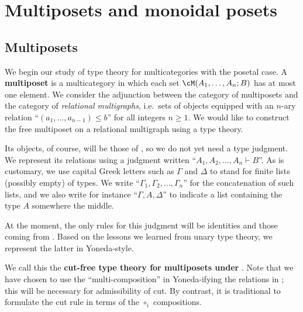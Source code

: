 \documentclass{book}
\let\types\vdash
\begin{document}
\section{Multiposets and monoidal posets}
\label{sec:multiposets-monpos}

\subsection{Multiposets}
\label{sec:multiposets}

We begin our study of type theory for multicategories with the posetal case.
A \textbf{multiposet} is a multicategory in which each set $\cM(A_1,\dots,A_n;B)$ has at most one element.
We consider the adjunction between the category \bMPos of multiposets and the category \bRelMGr of \emph{relational multigraphs}, i.e.\ sets of objects equipped with an $n$-ary relation ``$(a_1,\dots,a_{n-1})\le b$'' for all integers $n\ge 1$.
We would like to construct the free multiposet on a relational multigraph \cG using a type theory.

Its objects, of course, will be those of \cG, so we do not yet need a type judgment.
We represent its relations using a judgment written ``$A_1,A_2,\dots,A_n \types B$''.
As is customary, we use capital Greek letters such as $\Gamma$ and $\Delta$ to stand for finite lists (possibly empty) of types.
We write ``$\Gamma_1,\Gamma_2,\dots,\Gamma_n$'' for the concatenation of such lists, and we also write for instance ``$\Gamma,A,\Delta$'' to indicate a list containing the type $A$ somewhere the middle.

At the moment, the only rules for this judgment will be identities and those coming from \cG.
Based on the lessons we learned from unary type theory, we represent the latter in Yoneda-style.
We call this the \textbf{cut-free type theory for multiposets under \cG}.
Note that we have chosen to use the ``multi-composition'' in Yoneda-ifying the relations in \cG; this will be necessary for admissibility of cut.
By contrast, it is traditional to formulate the cut rule in terms of the $\circ_i$ compositions.
\end{document}
